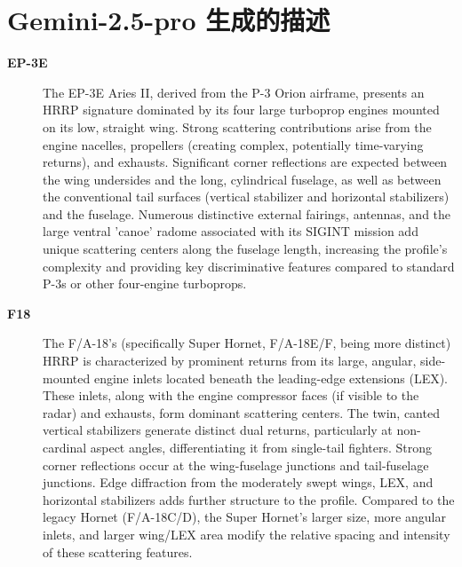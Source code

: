 \section{Gemini-2.5-pro 生成的描述}
\label{sec:gemini_desc}
\footnotesize
{\begin{description}
    \item[\textbf{EP-3E}]
    The EP-3E Aries II, derived from the P-3 Orion airframe, presents an HRRP signature dominated by its four large turboprop engines mounted on its low, straight wing. Strong scattering contributions arise from the engine nacelles, propellers (creating complex, potentially time-varying returns), and exhausts. Significant corner reflections are expected between the wing undersides and the long, cylindrical fuselage, as well as between the conventional tail surfaces (vertical stabilizer and horizontal stabilizers) and the fuselage. Numerous distinctive external fairings, antennas, and the large ventral 'canoe' radome associated with its SIGINT mission add unique scattering centers along the fuselage length, increasing the profile's complexity and providing key discriminative features compared to standard P-3s or other four-engine turboprops.

    \item[\textbf{F18}]
    The F/A-18's (specifically Super Hornet, F/A-18E/F, being more distinct) HRRP is characterized by prominent returns from its large, angular, side-mounted engine inlets located beneath the leading-edge extensions (LEX). These inlets, along with the engine compressor faces (if visible to the radar) and exhausts, form dominant scattering centers. The twin, canted vertical stabilizers generate distinct dual returns, particularly at non-cardinal aspect angles, differentiating it from single-tail fighters. Strong corner reflections occur at the wing-fuselage junctions and tail-fuselage junctions. Edge diffraction from the moderately swept wings, LEX, and horizontal stabilizers adds further structure to the profile. Compared to the legacy Hornet (F/A-18C/D), the Super Hornet's larger size, more angular inlets, and larger wing/LEX area modify the relative spacing and intensity of these scattering features.


\end{description}}

